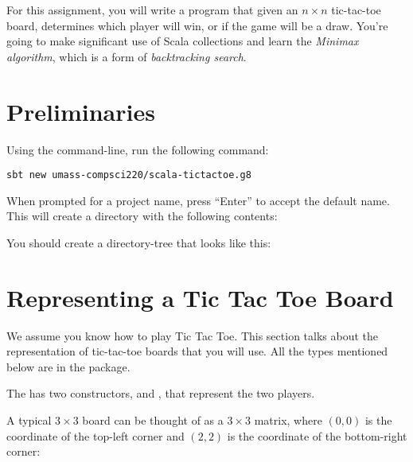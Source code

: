 \documentclass[9pt]{extbook}
\begin{document}
For this assignment, you will write a program that given an $n \times n$
tic-tac-toe board,
determines which player will win, or if the game will be a draw.
You're going to make significant use of Scala collections and learn the
\emph{Minimax algorithm}, which is a form of \emph{backtracking search}.

\section{Preliminaries}

Using the command-line, run the following command:

\begin{lstlisting}
sbt new umass-compsci220/scala-tictactoe.g8
\end{lstlisting}

When prompted for a project name, press “Enter” to accept the default name.
This will create a directory with the following contents:

You should create a directory-tree that looks like this:


\section{Representing a Tic Tac Toe Board}

We assume you know how to play Tic Tac Toe. This section talks about
the representation of tic-tac-toe boards that you will use. All
the types mentioned below are in the  package.

The  has two constructors,
 and , that represent the
two players.

A typical $3 \times 3$ board can be thought of as a $3 \times 3$ matrix,
where $(0, 0)$ is
the coordinate of the top-left corner and $(2,2)$ is the coordinate of
the bottom-right corner:

\end{document}
